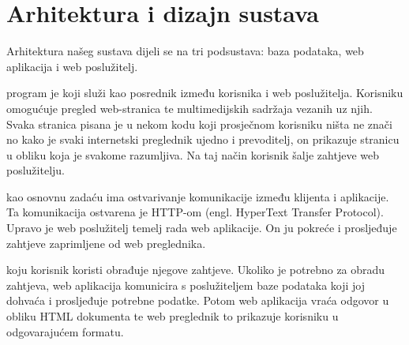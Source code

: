 \chapter{Arhitektura i dizajn sustava}
		


		Arhitektura našeg sustava dijeli se na tri podsustava: baza podataka, web aplikacija i web poslužitelj.
			
		 program je koji služi kao posrednik između korisnika i web poslužitelja. Korisniku omogućuje pregled web-stranica te multimedijskih sadržaja vezanih uz njih. Svaka stranica pisana je u nekom kodu koji prosječnom korisniku ništa ne znači no kako je svaki internetski preglednik ujedno i prevoditelj, on prikazuje stranicu u obliku koja je svakome razumljiva. Na taj način korisnik šalje zahtjeve web poslužitelju.
		
		 kao osnovnu zadaću ima ostvarivanje komunikacije između klijenta i aplikacije.  Ta komunikacija ostvarena je HTTP-om (engl. HyperText Transfer Protocol). Upravo je web poslužitelj temelj rada web aplikacije. On ju pokreće i prosljeđuje zahtjeve zaprimljene od web preglednika.
		
		 koju korisnik koristi obrađuje njegove zahtjeve. Ukoliko je potrebno za obradu zahtjeva, web aplikacija komunicira s poslužiteljem baze podataka koji joj dohvaća i prosljeđuje potrebne podatke. Potom web aplikacija vraća odgovor u obliku HTML dokumenta te web preglednik to prikazuje korisniku u odgovarajućem formatu.
		
